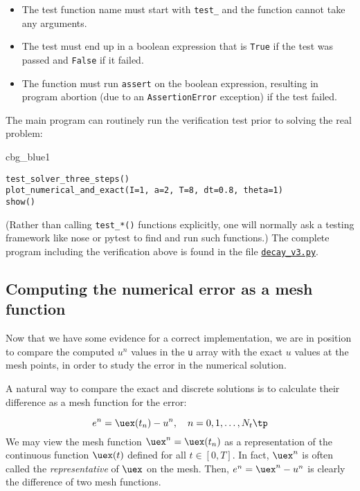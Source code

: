 \documentclass[graybox,sectrefs,envcountresetchap,open=right,final]{svmonodo}
\newenvironment{_cod_tight}[1]{
   \def\FrameCommand{\colorbox{#1}}
   \FrameRule0.6pt\MakeFramed {\FrameRestore}\vskip3mm}
   {\vskip0mm\endMakeFramed}
\newenvironment{cod}[1]{
\bgroup\rmfamily
\fboxsep=0mm\relax
\begin{_cod_tight}{#1}
\list{}{\parsep=-2mm\parskip=0mm\topsep=0pt\leftmargin=2mm
\rightmargin=2\leftmargin\leftmargin=4pt\relax}
\item\relax}
{\endlist\end{_cod_tight}\egroup}
\begin{document}
\begin{itemize}
 \item The test function name must start with \Verb!test_! and the function
   cannot take any arguments.

 \item The test must end up in a boolean expression that is \texttt{True} if
   the test was passed and \texttt{False} if it failed.

 \item The function must run \texttt{assert} on the boolean expression, resulting
   in program abortion (due to an \texttt{AssertionError} exception) if
   the test failed.
\end{itemize}

\noindent
The main program can routinely run the verification test prior to
solving the real problem:

\begin{cod}{cbg_blue1}\begin{Verbatim}[numbers=none,fontsize=\fontsize{9pt}{9pt},baselinestretch=0.95,xleftmargin=2mm]
test_solver_three_steps()
plot_numerical_and_exact(I=1, a=2, T=8, dt=0.8, theta=1)
show()
\end{Verbatim}
\end{cod}
\noindent
(Rather than calling \Verb!test_*()! functions explicitly, one will
normally ask a testing framework like nose
or pytest to find and run such functions.)
The complete program including the verification above is
found in the file \href{{http://tinyurl.com/ofkw6kc/alg/decay_v3.py}}{\nolinkurl{decay_v3.py}}.


\subsection{Computing the numerical error as a mesh function}
\label{decay:computing:error}

Now that we have some evidence for a correct implementation, we are in
position to compare the computed $u^n$ values in the \texttt{u} array with
the exact $u$ values at the mesh points, in order to study the error
in the numerical solution.


A natural way to compare the exact and discrete solutions is to
calculate their difference as a mesh function for the error:

\begin{equation}
e^n = \uex(t_n) - u^n,\quad n=0,1,\ldots,N_t \tp
\end{equation}
We may view the mesh function
$\uex^n = \uex(t_n)$ as a representation of the continuous function $\uex(t)$
defined for all $t\in [0,T]$. In fact,
$\uex^n$ is often called the \emph{representative} of
$\uex$ on the mesh. Then, $e^n = \uex^n - u^n$ is clearly
the difference of two mesh functions.
\end{document}

